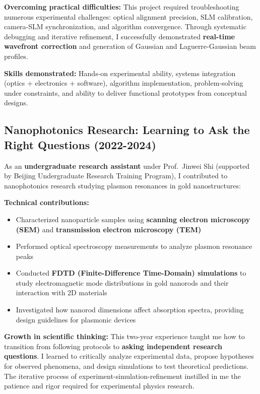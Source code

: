 \documentclass[11pt,a4paper]{article}
\begin{document}
\textbf{Overcoming practical difficulties:} This project required troubleshooting numerous experimental challenges: optical alignment precision, SLM calibration, camera-SLM synchronization, and algorithm convergence. Through systematic debugging and iterative refinement, I successfully demonstrated \textbf{real-time wavefront correction} and generation of Gaussian and Laguerre-Gaussian beam profiles.

\textbf{Skills demonstrated:} Hands-on experimental ability, systems integration (optics + electronics + software), algorithm implementation, problem-solving under constraints, and ability to deliver functional prototypes from conceptual designs.

\subsection{Nanophotonics Research: Learning to Ask the Right Questions (2022-2024)}

As an \textbf{undergraduate research assistant} under Prof.~Jinwei Shi (supported by Beijing Undergraduate Research Training Program), I contributed to nanophotonics research studying plasmon resonances in gold nanostructures:

\textbf{Technical contributions:}
\begin{itemize}
    \item Characterized nanoparticle samples using \textbf{scanning electron microscopy (SEM)} and \textbf{transmission electron microscopy (TEM)}
    \item Performed optical spectroscopy measurements to analyze plasmon resonance peaks
    \item Conducted \textbf{FDTD (Finite-Difference Time-Domain) simulations} to study electromagnetic mode distributions in gold nanorods and their interaction with 2D materials
    \item Investigated how nanorod dimensions affect absorption spectra, providing design guidelines for plasmonic devices
\end{itemize}

\textbf{Growth in scientific thinking:} This two-year experience taught me how to transition from following protocols to \textbf{asking independent research questions}. I learned to critically analyze experimental data, propose hypotheses for observed phenomena, and design simulations to test theoretical predictions. The iterative process of experiment-simulation-refinement instilled in me the patience and rigor required for experimental physics research.
\end{document}
